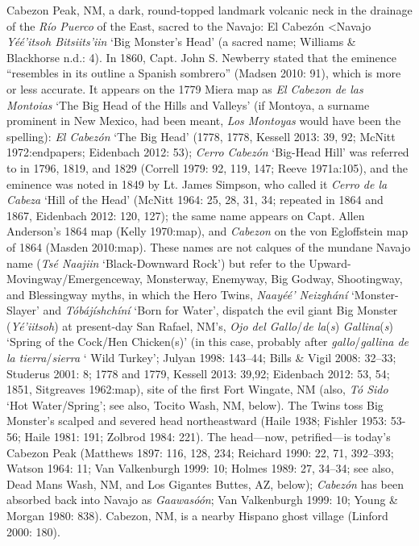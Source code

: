 Cabezon Peak, NM, a dark, round-topped landmark volcanic neck in the drainage of the \textit{Río Puerco} of the East, sacred to the Navajo: El Cabezón \textless Navajo \textit{Yéé'itsoh Bitsiits'iin} `Big Monster's Head' (a sacred name; Williams \& Blackhorse n.d.: 4).  In 1860, Capt. John S. Newberry stated that the eminence “resembles in its outline a Spanish sombrero” (Madsen 2010: 91), which is more or less accurate.  It appears on the 1779 Miera map as \textit{El Cabezon de las Montoias} ‘The Big Head of the Hills and Valleys’ (if Montoya, a surname prominent in New Mexico, had been meant, \textit{Los Montoyas }would have been the spelling):  \textit{El Cabezón} ‘The Big Head’ (1778, 1778, Kessell 2013: 39, 92; McNitt 1972:endpapers; Eidenbach 2012: 53); \textit{Cerro Cabezón }‘Big-Head Hill’ was referred to in 1796, 1819, and 1829 (Correll 1979: 92, 119, 147; Reeve 1971a:105), and the eminence was noted in 1849 by Lt. James Simpson, who called it \textit{Cerro de la Cabeza} ‘Hill of the Head’ (McNitt 1964: 25, 28, 31, 34; repeated in 1864 and 1867, Eidenbach 2012: 120, 127); the same name appears on Capt. Allen Anderson’s 1864 map (Kelly 1970:map), and \textit{Cabezon} on the von Egloffstein map of 1864 (Masden 2010:map).  These names are not calques of the mundane Navajo name (\textit{Tsé Naajiin} ‘Black-Downward Rock’) but refer to the Upward-Movingway/Emergenceway, Monsterway, Enemyway, Big Godway, Shootingway, and Blessingway myths, in which the Hero Twins, \textit{Naayéé’ Neizghání }‘Monster-Slayer’ and \textit{Tóbájíshchíní} ‘Born for Water’, dispatch the evil giant Big Monster (\textit{Yé’iitsoh}) at present-day San Rafael, NM’s, \textit{Ojo del Gallo}/\textit{de la}(\textit{s})\textit{ Gallina}(\textit{s}) ‘Spring of the Cock/Hen Chicken(s)’ (in this case, probably after \textit{gallo}/\textit{gallina de la tierra}/\textit{sierra} ‘ Wild Turkey’; Julyan 1998: 143–44; Bills \& Vigil 2008: 32–33; Studerus 2001: 8; 1778 and 1779, Kessell 2013: 39,92; Eidenbach 2012: 53, 54; 1851, Sitgreaves 1962:map), site of the first Fort Wingate, NM (also, \textit{Tó Sido} ‘Hot Water/Spring’; see also, Tocito Wash, NM, below).  The Twins toss Big Monster’s scalped and severed head northeastward (Haile 1938; Fishler 1953: 53-56; Haile 1981: 191; Zolbrod 1984: 221).  The head—now, petrified—is today’s Cabezon Peak (Matthews 1897: 116, 128, 234; Reichard 1990: 22, 71, 392–393; Watson 1964: 11; Van Valkenburgh 1999: 10; Holmes 1989: 27, 34–34; see also, Dead Mans Wash, NM, and Los Gigantes Buttes, AZ, below); \textit{Cabezón} has been absorbed back into Navajo as \textit{Gaawasóón}; Van Valkenburgh 1999: 10; Young \& Morgan 1980: 838).  Cabezon, NM, is a nearby Hispano ghost village (Linford 2000: 180).

